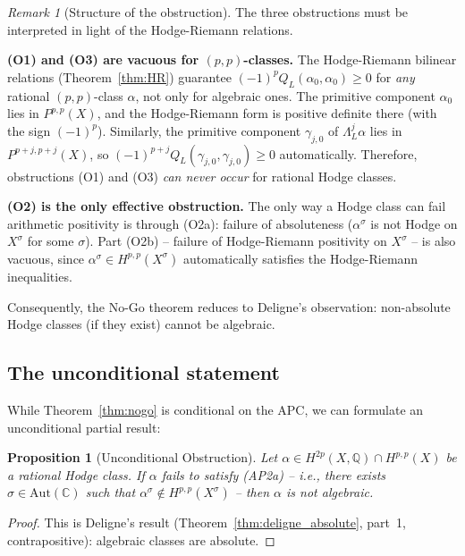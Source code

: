 \documentclass[aps,prd,twocolumn,superscriptaddress,nofootinbib]{revtex4-2}
\newtheorem{proposition}[theorem]{Proposition}
\theoremstyle{definition}
\theoremstyle{remark}
\newtheorem{remark}[theorem]{Remark}
\begin{document}
\begin{remark}[Structure of the obstruction]
\label{rem:obstruction_structure}
The three obstructions must be interpreted in light of the Hodge-Riemann relations.

\textbf{(O1) and (O3) are vacuous for $(p,p)$-classes.} The Hodge-Riemann bilinear relations (Theorem~\ref{thm:HR}) guarantee $(-1)^p Q_L(\alpha_0, \alpha_0) \geq 0$ for \textit{any} rational $(p,p)$-class $\alpha$, not only for algebraic ones. The primitive component $\alpha_0$ lies in $P^{p,p}(X)$, and the Hodge-Riemann form is positive definite there (with the sign $(-1)^p$). Similarly, the primitive component $\gamma_{j,0}$ of $\Lambda_L^j \alpha$ lies in $P^{p+j,p+j}(X)$, so $(-1)^{p+j} Q_L(\gamma_{j,0}, \gamma_{j,0}) \geq 0$ automatically. Therefore, obstructions (O1) and (O3) \textit{can never occur} for rational Hodge classes.

\textbf{(O2) is the only effective obstruction.} The only way a Hodge class can fail arithmetic positivity is through (O2a): failure of absoluteness ($\alpha^\sigma$ is not Hodge on $X^\sigma$ for some $\sigma$). Part (O2b) -- failure of Hodge-Riemann positivity on $X^\sigma$ -- is also vacuous, since $\alpha^\sigma \in H^{p,p}(X^\sigma)$ automatically satisfies the Hodge-Riemann inequalities.

Consequently, the No-Go theorem reduces to Deligne's observation: non-absolute Hodge classes (if they exist) cannot be algebraic.
\end{remark}

\subsection{The unconditional statement}

While Theorem~\ref{thm:nogo} is conditional on the APC, we can formulate an unconditional partial result:

\begin{proposition}[Unconditional Obstruction]
\label{prop:unconditional}
Let $\alpha \in H^{2p}(X, \mathbb{Q}) \cap H^{p,p}(X)$ be a rational Hodge class. If $\alpha$ fails to satisfy (AP2a) -- i.e., there exists $\sigma \in \mathrm{Aut}(\mathbb{C})$ such that $\alpha^\sigma \notin H^{p,p}(X^\sigma)$ -- then $\alpha$ is not algebraic.
\end{proposition}

\begin{proof}
This is Deligne's result (Theorem~\ref{thm:deligne_absolute}, part~1, contrapositive): algebraic classes are absolute.
\end{proof}
\end{document}
